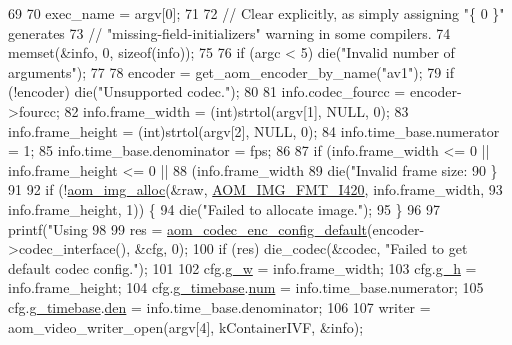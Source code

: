 \begin{DoxyCodeInclude}
{69 
70   exec\_name = argv[0];
71 
72   \textcolor{comment}{// Clear explicitly, as simply assigning "\{ 0 \}" generates}
73   \textcolor{comment}{// "missing-field-initializers" warning in some compilers.}
74   memset(&info, 0, \textcolor{keyword}{sizeof}(info));
75 
76   \textcolor{keywordflow}{if} (argc < 5) die(\textcolor{stringliteral}{"Invalid number of arguments"});
77 
78   encoder = get\_aom\_encoder\_by\_name(\textcolor{stringliteral}{"av1"});
79   \textcolor{keywordflow}{if} (!encoder) die(\textcolor{stringliteral}{"Unsupported codec."});
80 
81   info.codec\_fourcc = encoder->fourcc;
82   info.frame\_width = (int)strtol(argv[1], NULL, 0);
83   info.frame\_height = (int)strtol(argv[2], NULL, 0);
84   info.time\_base.numerator = 1;
85   info.time\_base.denominator = fps;
86 
87   \textcolor{keywordflow}{if} (info.frame\_width <= 0 || info.frame\_height <= 0 ||
88       (info.frame\_width %
89     die(\textcolor{stringliteral}{"Invalid frame size: %
90   \}
91 
92   \textcolor{keywordflow}{if} (!\hyperlink{aom__image_8h_a570db29fbd122951235a08fe9375f6bb}{aom\_img\_alloc}(&raw, \hyperlink{aom__image_8h_a930317c04b4bd0a660bb5e744055523cabd778a3d697463e89d12a1117f417b60}{AOM\_IMG\_FMT\_I420}, info.frame\_width,
93                      info.frame\_height, 1)) \{
94     die(\textcolor{stringliteral}{"Failed to allocate image."});
95   \}
96 
97   printf(\textcolor{stringliteral}{"Using %
98 
99   res = \hyperlink{group__encoder_gabe456ab6f99bdebc47018779b75d2521}{aom\_codec\_enc\_config\_default}(encoder->codec\_interface(), &cfg, 0);
100   \textcolor{keywordflow}{if} (res) die\_codec(&codec, \textcolor{stringliteral}{"Failed to get default codec config."});
101 
102   cfg.\hyperlink{structaom__codec__enc__cfg_a80cb459c5ef3c7e1516f617c4c9d6eab}{g\_w} = info.frame\_width;
103   cfg.\hyperlink{structaom__codec__enc__cfg_a37b0f57b63bec8d133df8901d4407ee6}{g\_h} = info.frame\_height;
104   cfg.\hyperlink{structaom__codec__enc__cfg_a10664f1fc5b6ec29b77ee13efeeecdf7}{g\_timebase}.\hyperlink{structaom__rational_a7b48174411798c780a15f132c4650839}{num} = info.time\_base.numerator;
105   cfg.\hyperlink{structaom__codec__enc__cfg_a10664f1fc5b6ec29b77ee13efeeecdf7}{g\_timebase}.\hyperlink{structaom__rational_adeddf2ea01c12b7be66536e0a0fb92c5}{den} = info.time\_base.denominator;
106 
107   writer = aom\_video\_writer\_open(argv[4], kContainerIVF, &info);
}}}
\end{DoxyCodeInclude}
